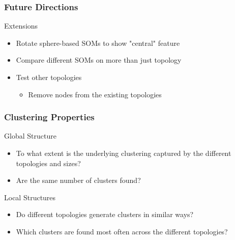 \documentclass[nototal,handout]{beamer}
\begin{document}
\begin{frame}
	\frametitle{Future Directions}
 
\begin{block}{Extensions}
 \begin{itemize}
 \item  Rotate sphere-based SOMs to show "central" feature
 \item  Compare different SOMs on more than just topology
 \item  Test other topologies
 \begin{itemize}
 \item  Remove nodes from the existing topologies
 \end{itemize}
 \end{itemize}
 \end{block} \end{frame} 

\begin{frame}
	\frametitle{Clustering Properties}
 
\begin{block}{Global Structure}
 \begin{itemize}
 \item To what extent is the underlying clustering captured by the different topologies and sizes?
 \item  Are the same number of clusters found?
 \end{itemize}
 \end{block} 
\begin{block}{Local Structures}
 \begin{itemize}
 \item  Do different topologies generate clusters in similar ways?
 \item  Which clusters are found most often across the different topologies?
 \end{itemize}
 \end{block} \end{frame}
\end{document}
